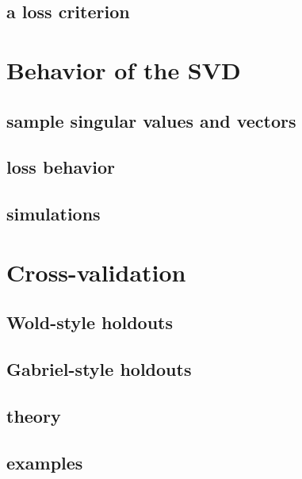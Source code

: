 \documentclass{beamer}
\begin{document}
\subsection{a loss criterion}

\section{Behavior of the SVD}
\subsection{sample singular values and vectors}
\subsection{loss behavior}
\subsection{simulations}

\section{Cross-validation}
\subsection{Wold-style holdouts}
\subsection{Gabriel-style holdouts}
\subsection{theory}
\subsection{examples}


\begin{frame}
\end{frame}
\end{document}
